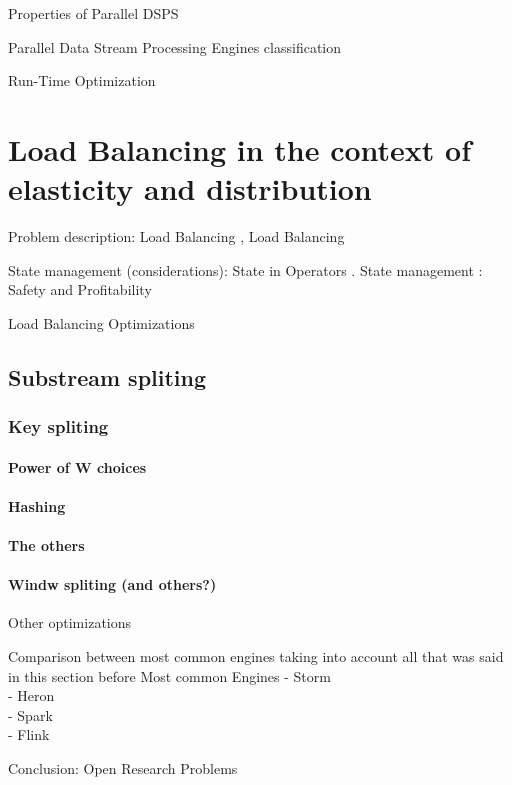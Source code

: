   Properties of Parallel DSPS \cite{R_ger_2019}

  Parallel Data Stream Processing Engines classification \cite{R_ger_2019}

  Run-Time Optimization\cite{chakravarthy2009stream}

  \section{Load Balancing in the context of elasticity and distribution}

  Problem description: Load Balancing  \cite{Hirzel_2014},   Load Balancing \cite{R_ger_2019}

  State management (considerations): State in Operators \cite{R_ger_2019}. State management \cite{R_ger_2019}: Safety and Profitability \cite{Schneider_2013R_ger_2019}

  Load Balancing Optimizations

  \subsection{Substream spliting}

  \subsubsection{Key spliting}

  \paragraph{Power of W choices}

  \paragraph{Hashing}

  \paragraph{The others}

  \paragraph{Windw spliting (and others?)}

  Other optimizations

  Comparison between most common engines taking into account all that was said in this section before
  Most common Engines  \cite{kamburugamuve2013survey}
  - Storm  \cite{kamburugamuve2013survey} \cite{R_ger_2019}\\
  - Heron \cite{R_ger_2019}\\
  - Spark \cite{R_ger_2019}\\
  - Flink \cite{R_ger_2019}

  Conclusion: Open Research Problems \cite{Schneider_2013}

